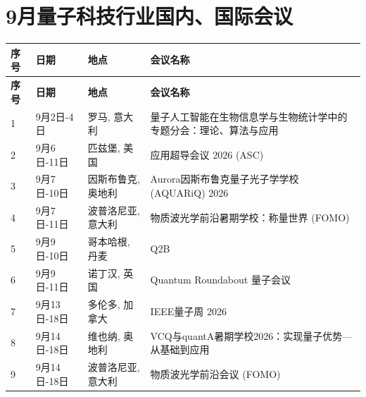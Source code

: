 \documentclass[12pt,a4paper]{ctexart}
\begin{document}
{
    \newpage
    \section*{ 9月量子科技行业国内、国际会议}
    \scriptsize
    \begin{longtable}{C{0.8cm}L{2.5cm}L{3cm}L{7cm}}
        \toprule[1.5pt]
        \textbf{序号} & \textbf{日期} & \textbf{地点} & \textbf{会议名称} \\
        \midrule
        \endfirsthead
        \toprule
        \textbf{序号} & \textbf{日期} & \textbf{地点} & \textbf{会议名称} \\
        \midrule
        \endhead
        \bottomrule
        \endfoot
        
        1 & 9月2日-4日 & 罗马, 意大利 & 量子人工智能在生物信息学与生物统计学中的专题分会：理论、算法与应用 \\
        \midrule[0.05pt]
        
        2 & 9月6日-11日 & 匹兹堡, 美国 & 应用超导会议 2026 (ASC) \\
        \midrule[0.05pt]
        
        3 & 9月7日-10日 & 因斯布鲁克, 奥地利 & Aurora因斯布鲁克量子光子学学校 (AQUARiQ) 2026 \\
        \midrule[0.05pt]
        
        4 & 9月7日-11日 & 波普洛尼亚, 意大利 & 物质波光学前沿暑期学校：称量世界 (FOMO) \\
        \midrule[0.05pt]
        
        5 & 9月9日-10日 & 哥本哈根, 丹麦 & Q2B \\
        \midrule[0.05pt]
        
        6 & 9月9日-11日 & 诺丁汉, 英国 & Quantum Roundabout 量子会议 \\
        \midrule[0.05pt]
        
        7 & 9月13日-18日 & 多伦多, 加拿大 & IEEE量子周 2026 \\
        \midrule[0.05pt]
        
        8 & 9月14日-18日 & 维也纳, 奥地利 & VCQ与quantA暑期学校2026：实现量子优势—从基础到应用 \\
        \midrule[0.05pt]
        
        9 & 9月14日-18日 & 波普洛尼亚, 意大利 & 物质波光学前沿会议 (FOMO) \\
        \midrule[0.05pt]
        

\end{longtable}}
\end{document}
